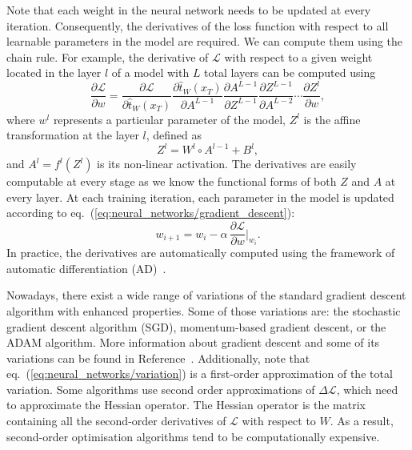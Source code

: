 Note that each weight in the neural network needs to be updated at every iteration. Consequently,
the derivatives of the loss function with respect to all learnable parameters in the model are
required. We can compute them using the chain rule. For example, the derivative of $\mathcal{L}$
with respect to a given weight located in the layer $l$ of a model with $L$ total layers can be
computed using
\begin{equation} 
    \frac{\partial \mathcal{L}}{\partial w} = 
        \frac{\partial \mathcal{L}}{\partial \hat{t}_W(x_T)} 
        \frac{\partial \hat{t}_W(x_T)}{\partial A^{L-1}} 
        \frac{\partial A^{L-1}}{\partial Z^{L-1}} 
        \frac{\partial Z^{L-1}}{\partial A^{L-2}} 
        \cdots 
        \frac{\partial Z^{l}}{\partial w}, 
\end{equation} 
where $w^l$ represents a particular parameter of the model, $Z^l$ is the affine transformation at
the layer $l$, defined as
\begin{equation}
    Z^l = W^l \circ A^{l-1} + B^l,
\end{equation}
and $A^l = f^l(Z^l)$ is its non-linear activation. The derivatives are easily computable at every
stage as we know the functional forms of both $Z$ and $A$ at every layer. At each training
iteration, each parameter in the model is updated according to
eq.~(\ref{eq:neural_networks/gradient_descent}):
\begin{equation} 
    w_{i + 1} = w_{i} - \alpha\, \frac{\partial \mathcal{L}}{\partial w}\bigg|_{w_i}. 
    \label{eq:neural_networks/weight_update}
\end{equation}
In practice, the derivatives are automatically computed using the framework of automatic
differentiation (AD)~\cite{paszke2017automatic, baydin2018automatic}.

Nowadays, there exist a wide range of variations of the standard gradient descent algorithm with
enhanced properties. Some of those variations are: the stochastic gradient descent algorithm (SGD),
momentum-based gradient descent, or the ADAM algorithm. More information about gradient descent and
some of its variations can be found in Reference~\cite{ruder2016overview}. Additionally, note that
eq.~(\ref{eq:neural_networks/variation}) is a first-order approximation of the total variation. Some
algorithms use second order approximations of $\Delta \mathcal{L}$, which need to approximate the
Hessian operator. The Hessian operator is the matrix containing all the second-order derivatives of
$\mathcal{L}$ with respect to $W$. As a result, second-order optimisation algorithms tend to be
computationally expensive.

